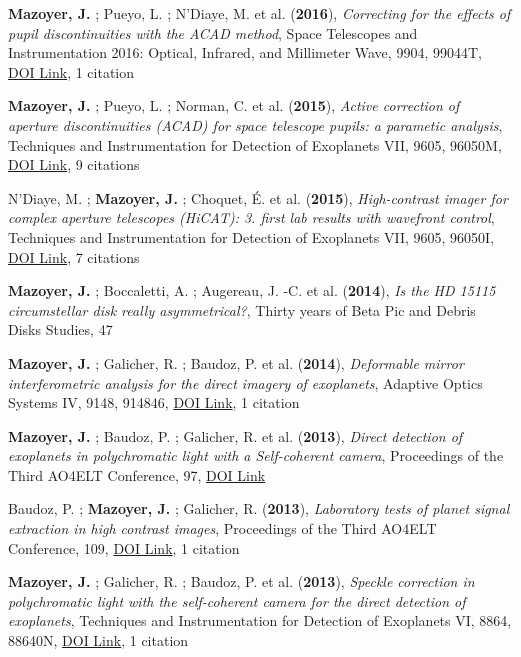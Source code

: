 \documentclass[11pt, a4paper, french]{article}
\begin{document}
\begin{etaremune}
 \item {\bf Mazoyer, J.} ; Pueyo, L. ; N'Diaye, M. et al. ({\bf2016}), {\it Correcting for the effects of pupil discontinuities with the ACAD method}, Space Telescopes and Instrumentation 2016: Optical, Infrared, and Millimeter Wave, 9904, 99044T, \href{https://doi.org/10.1117/12.2232907}{DOI Link}, 1 citation

 \item {\bf Mazoyer, J.} ; Pueyo, L. ; Norman, C. et al. ({\bf2015}), {\it Active correction of aperture discontinuities (ACAD) for space telescope pupils: a parametic analysis}, Techniques and Instrumentation for Detection of Exoplanets VII, 9605, 96050M, \href{https://doi.org/10.1117/12.2188692}{DOI Link}, 9 citations

 \item N'Diaye, M. ; {\bf Mazoyer, J.} ; Choquet, {\'E}. et al. ({\bf2015}), {\it High-contrast imager for complex aperture telescopes (HiCAT): 3. first lab results with wavefront control}, Techniques and Instrumentation for Detection of Exoplanets VII, 9605, 96050I, \href{https://doi.org/10.1117/12.2188497}{DOI Link}, 7 citations

 \item {\bf Mazoyer, J.} ; Boccaletti, A. ; Augereau, J. -C. et al. ({\bf2014}), {\it Is the HD 15115 circumstellar disk really asymmetrical?}, Thirty years of Beta Pic and Debris Disks Studies, 47

 \item {\bf Mazoyer, J.} ; Galicher, R. ; Baudoz, P. et al. ({\bf2014}), {\it Deformable mirror interferometric analysis for the direct imagery of exoplanets}, Adaptive Optics Systems IV, 9148, 914846, \href{https://doi.org/10.1117/12.2057833}{DOI Link}, 1 citation

 \item {\bf Mazoyer, J.} ; Baudoz, P. ; Galicher, R. et al. ({\bf2013}), {\it Direct detection of exoplanets in polychromatic light with a Self-coherent camera}, Proceedings of the Third AO4ELT Conference, 97, \href{https://doi.org/10.12839/AO4ELT3.13416}{DOI Link}

 \item Baudoz, P. ; {\bf Mazoyer, J.} ; Galicher, R. ({\bf2013}), {\it Laboratory tests of planet signal extraction in high contrast images}, Proceedings of the Third AO4ELT Conference, 109, \href{https://doi.org/10.12839/AO4ELT3.13701}{DOI Link}, 1 citation

 \item {\bf Mazoyer, J.} ; Galicher, R. ; Baudoz, P. et al. ({\bf2013}), {\it Speckle correction in polychromatic light with the self-coherent camera for the direct detection of exoplanets}, Techniques and Instrumentation for Detection of Exoplanets VI, 8864, 88640N, \href{https://doi.org/10.1117/12.2023508}{DOI Link}, 1 citation


\end{etaremune}
\end{document}
